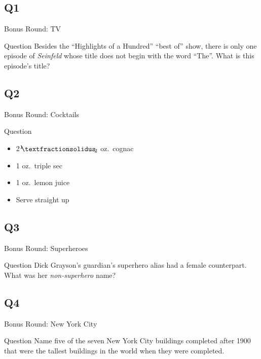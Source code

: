\documentclass[11pt]{beamer}
\begin{document}
\subsection*{Q1}
\begin{frame}[t]{Bonus Round: TV}
\begin{block}{Question}
Besides the ``Highlights of a Hundred'' ``best of'' show, there is only one episode of \emph{Seinfeld} whose title does not begin with the word ``The''. What is this episode's title?
\end{block}
\end{frame}
\subsection*{Q2}
\begin{frame}[t]{Bonus Round: Cocktails}
\begin{block}{Question}
\begin{itemize}
\item 2\({}^1{\mskip -5mu⁄\mskip -3mu}_2\) oz.\ cognac
\item 1 oz.\ triple sec
\item 1 oz.\ lemon juice
\item Serve straight up
\end{itemize}
\end{block}
\end{frame}
\subsection*{Q3}
\begin{frame}[t]{Bonus Round: Superheroes}
\begin{block}{Question}
Dick Grayson's guardian's superhero alias had a female counterpart. What was her \emph{non-superhero} name?
\end{block}
\end{frame}
\subsection*{Q4}
\begin{frame}[t]{Bonus Round: New York City}
\begin{block}{Question}
Name five of the seven New York City buildings completed after 1900 that were the tallest buildings in the world when they were completed.
\end{block}
\end{frame}
\end{document}

